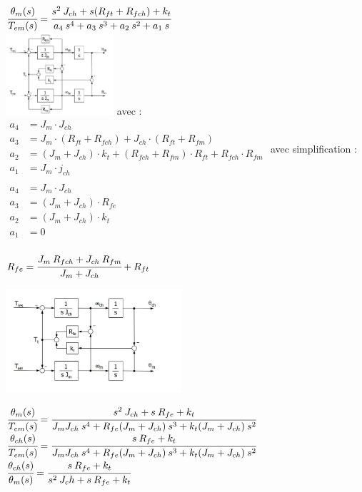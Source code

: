 \documentclass[	DIV=calc,%
							paper=a4,%
							fontsize=10pt,%
							twocolumn]{scrartcl} %
\begin{document}
$\cfrac{\theta_m(s)}{T_{em}(s)} = \cfrac{s^2\:J_{ch} + s(R_{ft} + R_{fch}) + k_t}{a_4\: s^4 + a_3\: s^3 + a_2 \:s^2 + a_1 \:s}$\\
{\centering
\includegraphics[width=0.3\textwidth]{img/arbre_elastique_2.JPG}
}
avec :\\
{\normalsize
$
    \begin{aligned}
        a_4 &= J_m \cdot J_{ch}\\
        a_3 &= J_m \cdot  (R_{ft} + R_{fch}) + J_{ch} \cdot (R_{ft} + R_{fm})\\
        a_2 &= (J_m + J_{ch})\cdot k_t + (R_{fch} + R_{fm}) \cdot R_{ft} + R_{fch} \cdot R_{fm}\\
        a_1 &= J_m \cdot j_{ch}\\
    \end{aligned}
$
}
avec simplification : 
{\normalsize
$
    \begin{aligned}
        a_4 &= J_m \cdot J_{ch}\\
        a_3 &=( J_m + J_{ch}) \cdot R_{fe}\\
        a_2 &= (J_m + J_{ch})\cdot k_t\\
        a_1 &= 0\\
    \end{aligned}
$
}

$R_{fe} = \cfrac{J_m \: R_{fch} + J_{ch}\:R_{fm}}{J_m + J_{ch}} + R_{ft}$


\includegraphics[width=0.49\textwidth]{img/arbre_elastique_3.JPG}

{\normalsize
$\cfrac{\theta_m(s)}{T_{em}(s)} = \cfrac{s^2\:J_{ch} + s\:R_{fe} + k_t}{J_mJ_{ch}\: s^4 + R_{fe}(J_m+J_{ch})\: s^3 + k_t(J_m+J_{ch}) \:s^2 }$\\


$\cfrac{\theta_{ch}(s)}{T_{em}(s)} = \cfrac{s\:R_{fe} + k_t}{J_mJ_{ch}\: s^4 + R_{fe}(J_m+J_{ch})\: s^3 + k_t(J_m+J_{ch}) \:s^2 }$\\


$\cfrac{\theta_{ch}(s)}{\theta_m(s)} = \cfrac{s\:R_{fe} + k_t}{s^2\: J_ch + s\:R_{fe} + k_t}$\\
}
\end{document}
